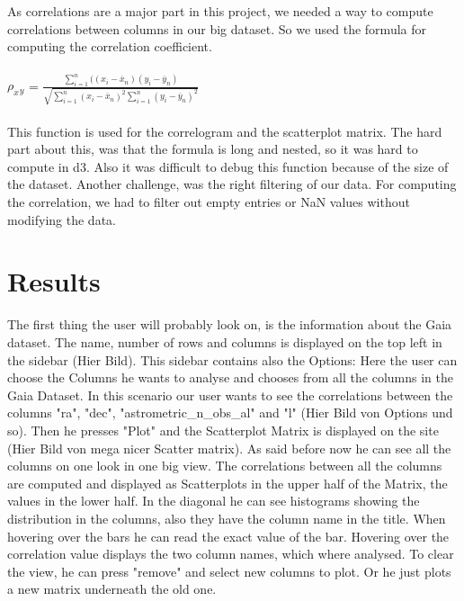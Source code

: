 \documentclass{vgtc}                          %
\begin{document}
\\
\\
As correlations are a major part in this project, we needed a way to compute correlations between columns in our big dataset.
So we used the formula for computing the correlation coefficient.\cite{corr}
\\
\\
$\rho_x{}_y$ = $\frac{\sum_{i=1}^n ((x_i-\overline{x}_n)(y_i - \overline{y}_n)}{\sqrt{\sum_{i=1}^n (x_i - \overline{x}_n)^2\sum_{i=1}^n(y_i - \overline{y}_n)^2}}$
\\
\\
This function is used for the correlogram and the scatterplot matrix.
The hard part about this, was that the formula is long and nested, so it was hard to compute in d3. Also it was difficult to debug this function because of the size of the dataset. Another challenge, was the right filtering of our data. For computing the correlation, we had to filter out empty entries or NaN values without modifying the data.
\section{Results}
The first thing the user will probably look on, is the information about the Gaia dataset. The name, number of rows and columns is displayed on the top left in the sidebar (Hier Bild). This sidebar contains also the Options: Here the user can choose the Columns he wants to analyse and chooses from all the columns in the Gaia Dataset. In this scenario our user wants to see the correlations between the columns "ra", "dec", "astrometric\_n\_obs\_al" and "l" (Hier Bild von Options und so). Then he presses "Plot" and the Scatterplot Matrix is displayed on the site (Hier Bild von mega nicer Scatter matrix). As said before now he can see all the columns on one look in one big view. The correlations between all the columns are computed and displayed as Scatterplots in the upper half of the Matrix, the values in the lower half. In the diagonal he can see histograms showing the distribution in the columns, also they have the column name in the title. When hovering over the bars he can read the exact value of the bar. Hovering over the correlation value displays the two column names, which where analysed. To clear the view, he can press "remove" and select new columns to plot. Or he just plots a new matrix underneath the old one.
\end{document}
